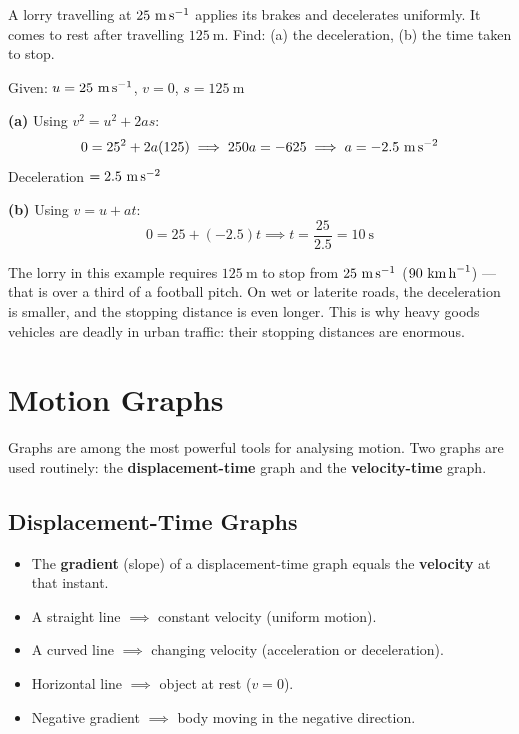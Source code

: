 \begin{examplebox}[3.2]
A lorry travelling at $25\ \text{m\,s}^{-1}$ applies its
brakes and decelerates uniformly. It comes to rest after
travelling $125\ \text{m}$. Find: (a) the deceleration,
(b) the time taken to stop.
\end{examplebox}

\begin{solutionbox}
Given: $u = 25\ \text{m\,s}^{-1}$,
$v = 0$, $s = 125\ \text{m}$

\textbf{(a)} Using $v^2 = u^2 + 2as$:
\[
  0 = 25^2 + 2a(125)
  \implies 250a = -625
  \implies a = -2.5\ \text{m\,s}^{-2}
\]
Deceleration $= 2.5\ \text{m\,s}^{-2}$

\textbf{(b)} Using $v = u + at$:
\[
  0 = 25 + (-2.5)t
  \implies t = \frac{25}{2.5} = 10\ \text{s}
\]

\begin{realworldbox}
The lorry in this example requires $125\ \text{m}$ to
stop from $25\ \text{m\,s}^{-1}$ ($90\ \text{km\,h}^{-1}$)
--- that is over a third of a football pitch. On wet or
laterite roads, the deceleration is smaller, and the
stopping distance is even longer. This is why heavy goods
vehicles are deadly in urban traffic: their stopping
distances are enormous.
\end{realworldbox}
\end{solutionbox}

\section{Motion Graphs}

Graphs are among the most powerful tools for analysing
motion. Two graphs are used routinely: the
\textbf{displacement-time} graph and the
\textbf{velocity-time} graph.

\subsection{Displacement-Time Graphs}

\begin{lawbox}
\begin{itemize}[noitemsep]
  \item The \textbf{gradient} (slope) of a
  displacement-time graph equals the \textbf{velocity}
  at that instant.
  \item A straight line $\implies$ constant velocity
  (uniform motion).
  \item A curved line $\implies$ changing velocity
  (acceleration or deceleration).
  \item Horizontal line $\implies$ object at rest ($v = 0$).
  \item Negative gradient $\implies$ body moving in the
  negative direction.
\end{itemize}
\end{lawbox}

